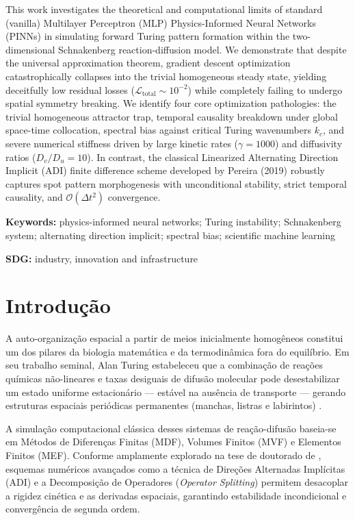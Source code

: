 \documentclass[a4paper, 12pt, twoside]{article}
\renewcommand{\qabstract}[6]{%
  \vspace{0.35em}%
  \noindent{\normalfont\normalsize\bfseries\MakeUppercase{#1}}\par%
  \vspace{0.15em}%
  \noindent #4\par%
  \vspace{0.25em}%
  \noindent\textbf{#2:} #5\par%
  \vspace{0.15em}%
  \noindent\textbf{#3:} #6\par%
  \vspace{0.5em}%
}
\begin{document}
\qabstract{Abstract}{Keywords}{SDG}{%
This work investigates the theoretical and computational limits of standard (vanilla)
Multilayer Perceptron (MLP) Physics-Informed Neural Networks (PINNs) in simulating forward
Turing pattern formation within the two-dimensional Schnakenberg reaction-diffusion model.
We demonstrate that despite the universal approximation theorem, gradient descent optimization
catastrophically collapses into the trivial homogeneous steady state, yielding deceitfully
low residual losses ($\mathcal{L}_{\mathrm{total}} \sim 10^{-2}$) while completely failing to undergo spatial
symmetry breaking. We identify four core optimization pathologies: the trivial homogeneous
attractor trap, temporal causality breakdown under global space-time collocation, spectral
bias against critical Turing wavenumbers $k_c$, and severe numerical stiffness driven by
large kinetic rates ($\gamma = 1000$) and diffusivity ratios ($D_v/D_u = 10$). In contrast,
the classical Linearized Alternating Direction Implicit (ADI) finite difference scheme
developed by Pereira (2019) robustly captures spot pattern morphogenesis with unconditional
stability, strict temporal causality, and $\mathcal{O}(\Delta t^2)$ convergence.%
}{%
physics-informed neural networks; Turing instability; Schnakenberg system;
alternating direction implicit; spectral bias; scientific machine learning%
}{%
industry, innovation and infrastructure%
}


\section{Introdução}

A auto-organização espacial a partir de meios inicialmente homogêneos constitui um dos
pilares da biologia matemática e da termodinâmica fora do equilíbrio. Em seu trabalho
seminal, Alan Turing \cite{turing1952chemical} estabeleceu que a combinação de reações
químicas não-lineares e taxas desiguais de difusão molecular pode desestabilizar um
estado uniforme estacionário --- estável na ausência de transporte --- gerando estruturas
espaciais periódicas permanentes (manchas, listras e labirintos) \cite{murray2003}.

A simulação computacional clássica desses sistemas de reação-difusão baseia-se em
Métodos de Diferenças Finitas (MDF), Volumes Finitos (MVF) e Elementos Finitos (MEF).
Conforme amplamente explorado na tese de doutorado de \textcite{pereira2019}, esquemas
numéricos avançados como a técnica de Direções Alternadas Implícitas (ADI) e a Decomposição
de Operadores (\textit{Operator Splitting}) permitem desacoplar a rigidez cinética e as
derivadas espaciais, garantindo estabilidade incondicional e convergência de segunda ordem.
\end{document}
